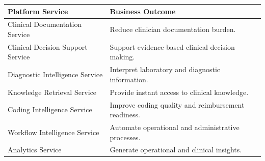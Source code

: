 \begin{center}

\begin{tabularx}{\textwidth}{|Y|Y|}

\hline


\textbf{Platform Service}

&

\textbf{Business Outcome}

\\

\hline

Clinical Documentation Service

&

Reduce clinician documentation burden.

\\

\hline

Clinical Decision Support Service

&

Support evidence-based clinical decision making.

\\

\hline

Diagnostic Intelligence Service

&

Interpret laboratory and diagnostic information.

\\

\hline

Knowledge Retrieval Service

&

Provide instant access to clinical knowledge.

\\

\hline

Coding Intelligence Service

&

Improve coding quality and reimbursement readiness.

\\

\hline

Workflow Intelligence Service

&

Automate operational and administrative processes.

\\

\hline

Analytics Service

&

Generate operational and clinical insights.

\\

\hline

\end{tabularx}

\end{center}

